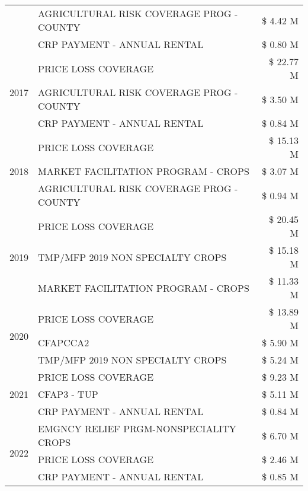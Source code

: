 \begin{tabular}{llr}
 & AGRICULTURAL RISK COVERAGE PROG - COUNTY & \$ 4.42 M \\
 & CRP PAYMENT - ANNUAL RENTAL & \$ 0.80 M \\
\cline{1-3}
\multirow[t]{3}{*}{2017} & PRICE LOSS COVERAGE & \$ 22.77 M \\
 & AGRICULTURAL RISK COVERAGE PROG - COUNTY & \$ 3.50 M \\
 & CRP PAYMENT - ANNUAL RENTAL & \$ 0.84 M \\
\cline{1-3}
\multirow[t]{3}{*}{2018} & PRICE LOSS COVERAGE & \$ 15.13 M \\
 & MARKET FACILITATION PROGRAM - CROPS & \$ 3.07 M \\
 & AGRICULTURAL RISK COVERAGE PROG - COUNTY & \$ 0.94 M \\
\cline{1-3}
\multirow[t]{3}{*}{2019} & PRICE LOSS COVERAGE & \$ 20.45 M \\
 & TMP/MFP 2019 NON SPECIALTY CROPS & \$ 15.18 M \\
 & MARKET FACILITATION PROGRAM - CROPS & \$ 11.33 M \\
\cline{1-3}
\multirow[t]{3}{*}{2020} & PRICE LOSS COVERAGE & \$ 13.89 M \\
 & CFAPCCA2 & \$ 5.90 M \\
 & TMP/MFP 2019 NON SPECIALTY CROPS & \$ 5.24 M \\
\cline{1-3}
\multirow[t]{3}{*}{2021} & PRICE LOSS COVERAGE & \$ 9.23 M \\
 & CFAP3 - TUP & \$ 5.11 M \\
 & CRP PAYMENT - ANNUAL RENTAL & \$ 0.84 M \\
\cline{1-3}
\multirow[t]{3}{*}{2022} & EMGNCY RELIEF PRGM-NONSPECIALITY CROPS & \$ 6.70 M \\
 & PRICE LOSS COVERAGE & \$ 2.46 M \\
 & CRP PAYMENT - ANNUAL RENTAL & \$ 0.85 M \\
\cline{1-3}
\bottomrule
\end{tabular}
